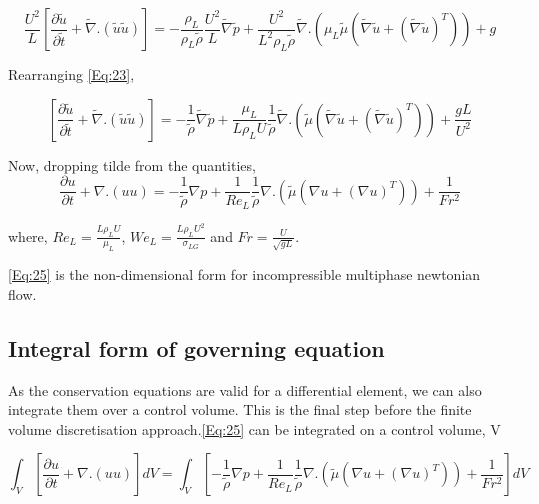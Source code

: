 \begin{equation}
 \frac{U^2}{L}\left[\frac{\partial \tilde u}{\partial \tilde t} + \tilde\nabla .(\tilde u \tilde u)\right]  = -\frac{\rho_L}{\rho_L \tilde\rho}\frac{U^2}{L}\tilde\nabla \tilde p
 + \frac{U^2}{L^2\rho_L \tilde\rho}\tilde \nabla .(\mu_L \tilde\mu (\tilde\nabla \tilde u + (\tilde\nabla \tilde u)^T)) +  g 
 \label{Eq:23}
\end{equation}

Rearranging \ref{Eq:23},

\begin{equation}
 \left[\frac{\partial \tilde u}{\partial \tilde t} + \tilde\nabla .(\tilde u \tilde u)\right]  = -\frac{1}{\tilde\rho}\tilde\nabla \tilde p
 + \frac{\mu_L}{L\rho_L U}\frac{1}{\tilde\rho}\tilde \nabla .(\tilde\mu (\tilde\nabla \tilde u + (\tilde\nabla \tilde u)^T)) +  \frac{gL}{U^2} 
 \label{Eq:24}
\end{equation}

Now, dropping tilde from the quantities,
\begin{equation}
 \frac{\partial  u}{\partial  t} + \nabla .( u  u)  = -\frac{1}{\tilde\rho}\nabla  p
 + \frac{1}{Re_L}\frac{1}{\tilde\rho} \nabla .(\tilde\mu (\nabla  u + (\nabla  u)^T)) +  \frac{1}{Fr^2} 
 \label{Eq:25}
\end{equation}

where, $Re_L = \frac{L\rho_L U}{\mu_L}$, $We_L = \frac{L \rho_L U^2}{\sigma_{LG}}$ and $Fr = \frac{U}{\sqrt{gL}}$. 

\ref{Eq:25} is the non-dimensional form for incompressible multiphase newtonian flow.

\subsection{Integral form of governing equation}
As the conservation equations are valid for a differential element, we can also integrate them over a control volume. This is the final step before the finite volume discretisation
approach.\ref{Eq:25} can be integrated on a control volume, V 

\begin{equation}
\int_V\left[ \frac{\partial  u}{\partial  t} + \nabla .( u  u)\right]dV  = \int_V\left[-\frac{1}{\tilde\rho}\nabla  p
 + \frac{1}{Re_L}\frac{1}{\tilde\rho} \nabla .(\tilde\mu (\nabla  u + (\nabla  u)^T)) +  \frac{1}{Fr^2}\right]dV 
 \label{Eq:26}
\end{equation}

